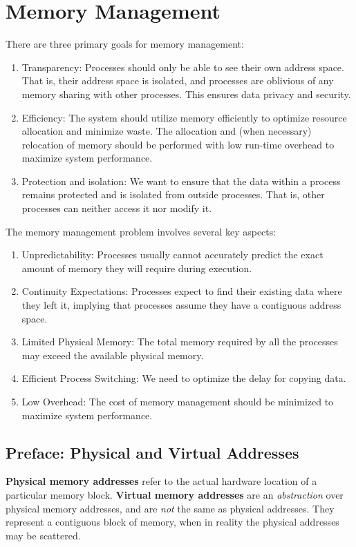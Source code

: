 \documentclass{report}
\newcommand{\definitionBegin}[1]{\begin{tcolorbox}[title={Definition: #1}]}
\newcommand{\definitionEnd}{\end{tcolorbox}}
\begin{document}
\chapter{Memory Management}
There are three primary goals for memory management:
\begin{enumerate}[label=\textit{(\roman*)}]
\item Transparency: Processes should only be able to see their own address space. That is, their
  address space is isolated, and processes are oblivious of any memory sharing with other
  processes. This ensures data privacy and security.
\item Efficiency: The system should utilize memory efficiently to optimize resource allocation and
  minimize waste. The allocation and (when necessary) relocation of memory should be performed with
  low run-time overhead to maximize system performance.
\item Protection and isolation: We want to ensure that the data within a process remains protected
  and is isolated from outside processes. That is, other processes can neither access it nor modify
  it.
\end{enumerate}
The memory management problem involves several key aspects:
\begin{enumerate}[label=\textit{(\roman*)}]
\item Unpredictability: Processes usually cannot accurately predict the exact amount of memory they
  will require during execution.
\item Continuity Expectations: Processes expect to find their existing data where they left it,
  implying that processes assume they have a contiguous address space.
\item Limited Physical Memory: The total memory required by all the processes may exceed the
  available physical memory.
\item Efficient Process Switching: We need to optimize the delay for copying data.
\item Low Overhead: The cost of memory management should be minimized to maximize system performance.
\end{enumerate}


\section*{Preface: Physical and Virtual Addresses}
\definitionBegin{Physical and Virtual Memory Addresses}
\textbf{Physical memory addresses} refer to the actual hardware location of a particular memory
block.
\tcblower
\textbf{Virtual memory addresses} are an \textit{abstraction} over physical memory addresses, and
are \textit{not} the same as physical addresses. They represent a contiguous block of memory, when
in reality the physical addresses may be scattered.
\definitionEnd
\end{document}

